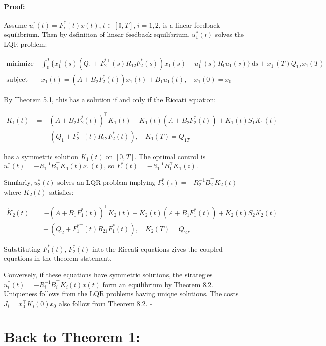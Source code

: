 \documentclass[3p]{elsarticle}
\newenvironment{proof}{\paragraph{Proof:}}{\hfill$\square$}
\begin{document}
\begin{proof}
Assume $u_i^*(t) = F_i^*(t) x(t)$, $t \in [0,T]$, $i=1,2$, is a linear feedback equilibrium. Then by definition of linear feedback equilibrium, $u_1^*(t)$ solves the LQR problem:

\begin{align*}
\text{minimize } & \int_0^T \{ x_1^\top(s) (Q_1 + F_{2}^{*\top}(s)R_{12}F_2^*(s)) x_1(s) + u_1^\top(s) R_1 u_1(s) \}\,\mathrm{d}s + x_1^\top(T) Q_{1T} x_1(T) \\
\text{subject to } & \dot{x}_1(t) = (A + B_2 F_2^*(t)) x_1(t) + B_1 u_1(t), \quad x_1(0) = x_0
\end{align*}

By Theorem 5.1, this has a solution if and only if the Riccati equation:

\begin{align*}
\dot{K}_1(t) &= -(A+B_2F_2^*(t))^\top K_1(t) - K_1(t)(A+B_2F_2^*(t)) + K_1(t)S_1K_1(t) \\
&\quad - (Q_1 + F_{2}^{*\top}(t)R_{12}F_2^*(t)), \quad K_1(T) = Q_{1T}  
\end{align*}

has a symmetric solution $K_1(t)$ on $[0,T]$. The optimal control is $u_1^*(t) = -R_1^{-1}B_1^\top K_1(t) x_1(t)$, so $F_1^*(t) = -R_1^{-1}B_1^\top K_1(t)$.

Similarly, $u_2^*(t)$ solves an LQR problem implying $F_2^*(t) = -R_2^{-1}B_2^\top K_2(t)$ where $K_2(t)$ satisfies: 

\begin{align*}
\dot{K}_2(t) &= -(A+B_1F_1^*(t))^\top K_2(t) - K_2(t)(A+B_1F_1^*(t)) + K_2(t)S_2K_2(t) \\  
&\quad - (Q_2 + F_{1}^{*\top}(t)R_{21}F_1^*(t)), \quad K_2(T) = Q_{2T}
\end{align*}

Substituting $F_1^*(t)$, $F_2^*(t)$ into the Riccati equations gives the coupled equations in the theorem statement.

Conversely, if these equations have symmetric solutions, the strategies $u_i^*(t) = -R_i^{-1}B_i^\top K_i(t) x(t)$ form an equilibrium by Theorem 8.2. Uniqueness follows from the LQR problems having unique solutions. The costs $J_i = x_0^\top K_i(0) x_0$ also follow from Theorem 8.2.
\end{proof}

\section*{Back to Theorem 1:}
\end{document}
